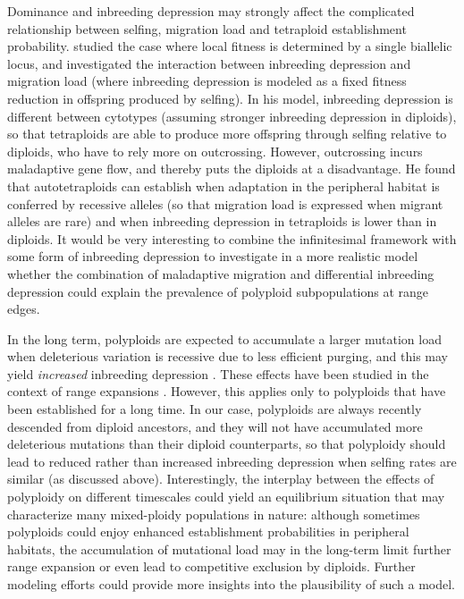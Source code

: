 \documentclass[12pt,a4paper]{article}
\begin{document}
Dominance and inbreeding depression may strongly affect the complicated
relationship between selfing, migration load and tetraploid establishment
probability.
\cite{griswold2021} studied the case where local fitness is determined by a
single biallelic locus, and investigated the interaction between inbreeding
depression and migration load (where inbreeding depression is modeled as a
fixed fitness reduction in offspring produced by selfing).
In his model, inbreeding depression is different between cytotypes (assuming
stronger inbreeding depression in diploids), so that tetraploids are able to
produce more offspring through selfing relative to diploids, who have to rely
more on outcrossing.
However, outcrossing incurs maladaptive gene flow, and thereby puts the
diploids at a disadvantage. 
He found that autotetraploids can establish when adaptation in the
peripheral habitat is conferred by recessive alleles (so that migration load is
expressed when migrant alleles are rare) and when inbreeding depression in
tetraploids is lower than in diploids.
It would be very interesting to combine the infinitesimal framework with some
form of inbreeding depression to investigate in a more realistic model whether
the combination of maladaptive migration and differential inbreeding depression
could explain the prevalence of polyploid subpopulations at range edges.

In the long term, polyploids are expected to accumulate a larger
mutation load when deleterious variation is recessive due to less efficient
purging, and this may yield \textit{increased} inbreeding depression
\citep{vlcek2025biorxiv}.
These effects have been studied in the context of range expansions
\citep{booker2024}.
However, this applies only to polyploids that have been established for a long
time.
In our case, polyploids are always recently descended from diploid ancestors,
and they will not have accumulated more deleterious mutations than their
diploid counterparts, so that polyploidy should lead to reduced rather than
increased inbreeding depression when selfing rates are similar (as discussed
above).
Interestingly, the interplay between the effects of polyploidy on different
timescales could yield an equilibrium situation that may characterize many
mixed-ploidy populations in nature: although sometimes polyploids could enjoy
enhanced establishment probabilities in peripheral habitats, the accumulation
of mutational load may in the long-term limit further range expansion or
even lead to competitive exclusion by diploids.
Further modeling efforts could provide more insights into the plausibility of
such a model.


%



\end{document}
